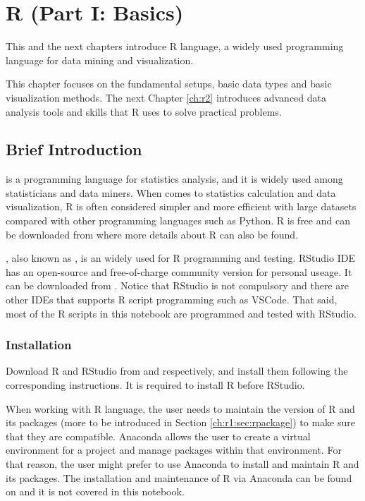 \chapter{R (Part I: Basics)} \label{ch:r1}

This and the next chapters introduce R language, a widely used programming language for data mining and visualization. 

This chapter focuses on the fundamental setups, basic data types and basic visualization methods. The next Chapter \ref{ch:r2} introduces advanced data analysis tools and skills that R uses to solve practical problems.

\section{Brief Introduction} \label{ch:r1:sec:rinstallation}

 is a programming language for statistics analysis, and it is widely used among statisticians and data miners. When comes to statistics calculation and data visualization, R is often considered simpler and more efficient with large datasets compared with other programming languages such as Python. R is free and can be downloaded from \cite{r} where more details about R can also be found.

, also known as , is an  widely used for R programming and testing. RStudio IDE has an open-source and free-of-charge community version for personal useage. It can be downloaded from \cite{rstudio}. Notice that RStudio is not compulsory and there are other IDEs that supports R script programming such as VSCode. That said, most of the R scripts in this notebook are programmed and tested with RStudio.

\subsection{Installation}

Download R and RStudio from \cite{r} and \cite{rstudio} respectively, and install them following the corresponding instructions. It is required to install R before RStudio.

When working with R language, the user needs to maintain the version of R and its packages (more to be introduced in Section \ref{ch:r1:sec:rpackage}) to make sure that they are compatible. Anaconda allows the user to create a virtual environment for a project and manage packages within that environment. For that reason, the user might prefer to use Anaconda to install and maintain R and its packages. The installation and maintenance of R via Anaconda can be found on \cite{anaconda2025r} and it is not covered in this notebook.


